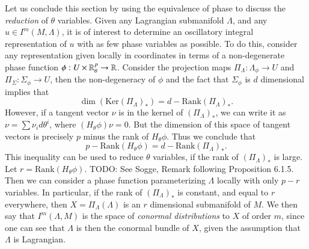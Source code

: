 Let us conclude this section by using the equivalence of phase to discuss the \emph{reduction} of $\theta$ variables. Given any Lagrangian submanifold $\Lambda$, and any $u \in I^m(M, \Lambda)$, it is of interest to determine an oscillatory integral representation of $u$ with as few phase variables as possible. To do this, consider any representation given locally in coordinates in terms of a non-degenerate phase function $\phi: U \times \operatorname{\mathbb{R}}^p_\theta \to \operatorname{\mathbb{R}}$. Consider the projection maps $\Pi_\Lambda: \Lambda_\phi \to U$ and $\Pi_\Sigma: \Sigma_\phi \to U$, then the non-degeneracy of $\phi$ and the fact that $\Sigma_\phi$ is $d$ dimensional implies that
%
\[ \dim ( \text{Ker} (\Pi_\Lambda)_* ) = d - \text{Rank} (\Pi_\Lambda)_*. \]
%
However, if a tangent vector $\nu$ is in the kernel of $(\Pi_\Lambda)_*$, we can write it as $\nu = \sum \nu_i d\theta^i$, where $(H_\theta \phi) \nu = 0$. But the dimension of this space of tangent vectors is precisely $p$ minus the rank of $H_\theta \phi$. Thus we conclude that
%
\[ p - \text{Rank}(H_\theta \phi) = d - \text{Rank} (\Pi_\Lambda)_*. \]
%
This inequality can be used to reduce $\theta$ variables, if the rank of $(\Pi_\Lambda)_*$ is large. Let $r = \text{Rank}(H_\theta \phi)$. TODO: See Sogge, Remark following Proposition 6.1.5. Then we can consider a phase function parameterizing $\Lambda$ locally with only $p - r$ variables. In particular, if the rank of $(\Pi_\Lambda)_*$ is constant, and equal to $r$ everywhere, then $X = \Pi_\Lambda(\Lambda)$ is an $r$ dimensional submanifold of $M$. We then say that $I^m(\Lambda,M)$ is the space of \emph{conormal distributions} to $X$ of order $m$, since one can see that $\Lambda$ is then the conormal bundle of $X$, given the assumption that $\Lambda$ is Lagrangian.

